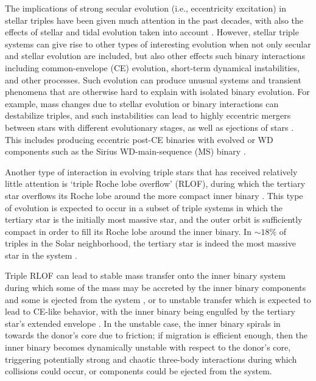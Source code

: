\documentclass[twocolumn,appendixfloats,tighten]{aastex631}
\begin{document}
The implications of strong secular evolution (i.e., eccentricity excitation) in stellar triples have been given much attention in the past decades, with also the effects of stellar and tidal evolution taken into account \citep[e.g.,][]{2013MNRAS.430.2262H,2016ComAC...3....6T,2016MNRAS.460.3494S,2019ApJ...878...58S}. However, stellar triple systems can give rise to other types of interesting evolution when not only secular and stellar evolution are included, but also other effects such binary interactions including common-envelope (CE) evolution, short-term dynamical instabilities, and other processes. Such evolution can produce unusual systems and transient phenomena that are otherwise hard to explain with isolated binary evolution. For example, mass changes due to stellar evolution or binary interactions can destabilize triples, and such instabilities can lead to highly eccentric mergers between stars with different evolutionary stages, as well as ejections of stars \citep{1994MNRAS.270..936K,1999ApJ...511..324I,2010arXiv1001.0581P,2011MNRAS.412.2763F,2011ApJ...734...55P,2012ApJ...760...99P,2021arXiv210713620H,2021arXiv210804272T}. This includes producing eccentric post-CE binaries with evolved or WD components such as the Sirius WD-main-sequence (MS) binary \citep[e.g.,][]{2005ApJ...630L..69L,2008A&A...480..797B,2012ApJ...760...99P,2017ApJ...840...70B,2021MNRAS.507.2659G}. 

Another type of interaction in evolving triple stars that has received relatively little attention is `triple Roche lobe overflow' (RLOF), during which the tertiary star overflows its Roche lobe around the more compact inner binary \citep[e.g.,][]{1980IAUS...88..145M,1996ASIC..477..345E,2014ApJ...781L..13T,2020MNRAS.491..495D,2020MNRAS.493.1855D}. This type of evolution is expected to occur in a subset of triple systems in which the tertiary star is the initially most massive star, and the outer orbit is sufficiently compact in order to fill its Roche lobe around the inner binary. In $\sim 18\%$ of triples in the Solar neighborhood, the tertiary star is indeed the most massive star in the system \citep{2010yCat..73890925T,2014MNRAS.438.1909D}. 

Triple RLOF can lead to stable mass transfer onto the inner binary system during which some of the mass may be accreted by the inner binary components and some is ejected from the system \citep[e.g.,][]{2014MNRAS.438.1909D,2019ApJ...871...84M,2020ApJ...889..114M}, or to unstable transfer which is expected to lead to CE-like behavior, with the inner binary being engulfed by the tertiary star's extended envelope \citep[e.g.,][]{2015MNRAS.450.1716S,2020MNRAS.498.2957C,2021MNRAS.500.1921G,2021MNRAS.505.4791S}. In the unstable case, the inner binary spirals in towards the donor's core due to friction; if migration is efficient enough, then the inner binary becomes dynamically unstable with respect to the donor's core, triggering potentially strong and chaotic three-body interactions during which collisions could occur, or components could be ejected from the system. 
\end{document}
